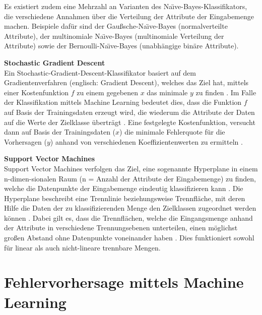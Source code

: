 Es existiert zudem eine Mehrzahl an Varianten des Na\"{\i}ve-Bayes-Klassifikators, die verschiedene Annahmen über die Verteilung der Attribute der Eingabemenge machen. Beispiele dafür sind der Gaußsche-Na\"{\i}ve-Bayes (normalverteilte Attribute), der multinomiale Na\"{\i}ve-Bayes (multinomiale Verteilung der Attribute) sowie der Bernoulli-Na\"{\i}ve-Bayes (unabhängige binäre Attribute).

\textbf{Stochastic Gradient Descent\medskip}\\
Ein Stochastic-Gradient-Descent-Klassifikator basiert auf dem Gradientenverfahren (englisch: Gradient Descent), welches das Ziel hat, mittels einer Kostenfunktion $f$ zu einem gegebenen $x$ das minimale $y$ zu finden \cite{Srinivasan2019}. Im Falle der Klassifikation mittels Machine Learning bedeutet dies, dass die Funktion $f$ auf Basis der Trainingsdaten erzeugt wird, die wiederum die Attribute der Daten auf die Werte der Zielklasse überträgt \cite{Diab2019}. Eine festgelegte Kostenfunktion, versucht dann auf Basis der Trainingsdaten ($x$) die minimale Fehlerquote für die Vorhersagen ($y$) anhand von verschiedenen Koeffizientenwerten zu ermitteln \cite{Diab2019}.

\textbf{Support Vector Machines\medskip}\\
Support Vector Machines verfolgen das Ziel, eine sogenannte \glqq Hyperplane\grqq{} in einem n-dimen-sionalen Raum (n = Anzahl der Attribute der Eingabemenge) zu finden, welche die Datenpunkte der Eingabemenge eindeutig klassifizieren kann \cite{Gandhi2018}. Die Hyperplane beschreibt eine Trennlinie beziehungsweise Trennfläche, mit deren Hilfe die Daten der zu klassifizierenden Menge den Zielklassen zugeordnet werden können \cite{Luber2019}. Dabei gilt es, dass die Trennflächen, welche die Eingangsmenge anhand der Attribute in verschiedene Trennungsebenen unterteilen, einen möglichst großen Abstand ohne Datenpunkte voneinander haben \cite{Luber2019}. Dies funktioniert sowohl für linear als auch nicht-lineare trennbare Mengen.

\section{Fehlervorhersage mittels Machine Learning}

